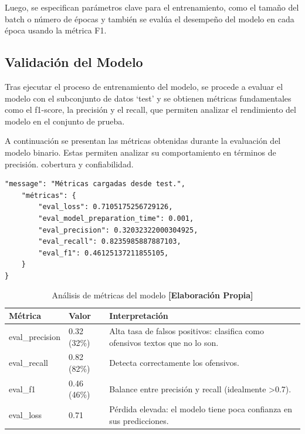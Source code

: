 Luego, se especifican parámetros clave para el entrenamiento, como el tamaño del batch o número de épocas y también se evalúa el desempeño del modelo en cada época usando la métrica F1.


\vspace{0.5cm}

\subsection{Validación del Modelo}

Tras ejecutar el proceso de entrenamiento del modelo, se procede a evaluar el modelo con el subconjunto de datos `test' y se obtienen métricas fundamentales como el f1-score, la precisión y el recall, que permiten analizar el rendimiento del modelo en el conjunto de prueba.

A continuación se presentan las métricas obtenidas durante la evaluación del modelo binario. Estas permiten analizar su comportamiento en términos de precisión. cobertura y confiabilidad.

\begin{lstlisting}[style=jsoncode]
"message": "Métricas cargadas desde test.",
    "métricas": {
        "eval_loss": 0.7105175256729126,
        "eval_model_preparation_time": 0.001,
        "eval_precision": 0.32032322000304925,
        "eval_recall": 0.8235985887887103,
        "eval_f1": 0.46125137211855105,
    }
}
\end{lstlisting}

\begin{table}[h!]
    \centering
    \begin{tabular}{|l|l|p{7cm}|}
        \hline
        \textbf{Métrica} & \textbf{Valor} & \textbf{Interpretación} \\
        \hline
        eval\_precision & 0.32 (32\%) & Alta tasa de falsos positivos: clasifica como ofensivos textos que no lo son. \\
        eval\_recall & 0.82 (82\%) & Detecta correctamente los ofensivos. \\
        eval\_f1 & 0.46 (46\%) & Balance entre precisión y recall (idealmente >0.7). \\
        eval\_loss & 0.71 & Pérdida elevada: el modelo tiene poca confianza en sus predicciones. \\
        \hline
    \end{tabular}
    \caption{Análisis de métricas del modelo \textbf{[Elaboración Propia]}}
\end{table}


